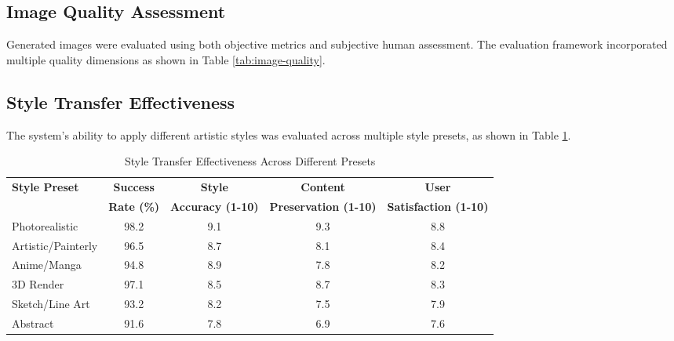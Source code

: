 \subsection{Image Quality Assessment}

Generated images were evaluated using both objective metrics and subjective human assessment. The evaluation framework incorporated multiple quality dimensions as shown in Table \ref{tab:image-quality}.

\begin{table}[h!]
\centering
\caption{Image Quality Assessment Results}
\label{tab:image-quality}
\end{table}

\subsection{Style Transfer Effectiveness}

The system's ability to apply different artistic styles was evaluated across multiple style presets, as shown in Table \ref{tab:style-effectiveness}.

\begin{table}[h!]
\centering
\caption{Style Transfer Effectiveness Across Different Presets}
\label{tab:style-effectiveness}
\begin{tabular}{|l|c|c|c|c|}
\hline
\textbf{Style Preset} & \textbf{Success} & \textbf{Style} & \textbf{Content} & \textbf{User} \\
                     & \textbf{Rate (\%)} & \textbf{Accuracy (1-10)} & \textbf{Preservation (1-10)} & \textbf{Satisfaction (1-10)} \\
\hline
Photorealistic & 98.2 & 9.1 & 9.3 & 8.8 \\
Artistic/Painterly & 96.5 & 8.7 & 8.1 & 8.4 \\
Anime/Manga & 94.8 & 8.9 & 7.8 & 8.2 \\
3D Render & 97.1 & 8.5 & 8.7 & 8.3 \\
Sketch/Line Art & 93.2 & 8.2 & 7.5 & 7.9 \\
Abstract & 91.6 & 7.8 & 6.9 & 7.6 \\
\hline
\end{tabular}
\end{table}

